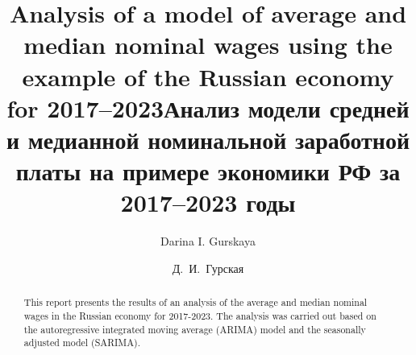 \begin{englishtitle}
\title{Analysis of a model of average and median nominal wages using the example of the Russian economy for 2017--2023}
\author{Darina I. Gurskaya}

\maketitle

\begin{abstract}
This report presents the results of an analysis of the average and median nominal wages in the Russian economy for 2017-2023. The analysis was carried out based on the autoregressive integrated moving average (ARIMA) model and the seasonally adjusted model (SARIMA).

\end{abstract}
\end{englishtitle}

\iffalse
\documentclass[12pt]{llncs}
\usepackage[T2A]{fontenc}
\usepackage[utf8]{inputenc}
\usepackage[english,russian]{babel}
\usepackage[russian]{nla}




\fi

\title{Анализ модели средней и медианной номинальной заработной платы на примере экономики РФ за 2017--2023 годы%
}
\author{Д.~И.~Гурская%
} 


\maketitle


